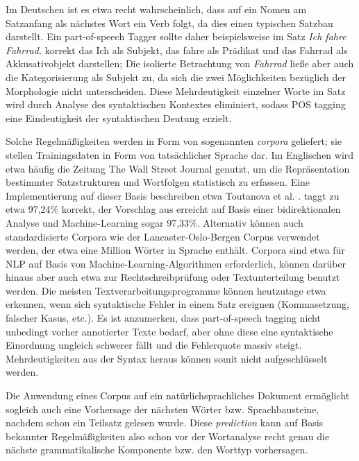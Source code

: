 \documentclass[12pt]{report}
\begin{document}
Im Deutschen ist es etwa recht wahrscheinlich, dass auf ein Nomen am Satzanfang als nächstes Wort ein Verb folgt, da dies einen typischen Satzbau darstellt. Ein part-of-speech Tagger sollte daher beispielsweise im Satz \textit{\glqq  Ich fahre Fahrrad.\grqq{}} korrekt das \glqq  Ich\grqq{} als Subjekt, das \glqq  fahre\grqq{} als Prädikat und das \glqq  Fahrrad\grqq{} als Akkusativobjekt darstellen; Die isolierte Betrachtung von \textit{\glqq  Fahrrad\grqq{}} ließe aber auch die Kategorisierung als Subjekt zu, da sich die zwei Möglichkeiten bezüglich der Morphologie nicht unterscheiden. Diese Mehrdeutigkeit einzelner Worte im Satz wird durch Analyse des syntaktischen Kontextes eliminiert, sodass POS tagging eine Eindeutigkeit der syntaktischen Deutung erzielt.

Solche Regelmäßigkeiten werden in Form von sogenannten \textit{corpora} geliefert; sie stellen Trainingsdaten in Form von tatsächlicher Sprache dar. Im Englischen wird etwa häufig die Zeitung The Wall Street Journal genutzt, um die Repräsentation bestimmter Satzstrukturen und Wortfolgen statistisch zu erfassen. Eine Implementierung auf dieser Basis beschreiben etwa Toutanova et al. \cite{tou03}. 
\cite{tou03} taggt zu etwa 97,24\% korrekt, der Vorschlag aus \cite{she07} erreicht auf Basis einer bidirektionalen Analyse und Machine-Learning sogar 97,33\%.
 Alternativ können auch standardisierte Corpora wie der Lancaster-Oslo-Bergen Corpus verwendet werden, der etwa eine Million Wörter in Sprache enthält. Corpora sind etwa für NLP auf Basis von Machine-Learning-Algorithmen erforderlich, können darüber hinaus aber auch etwa zur Rechtschreibprüfung oder Textunterteilung benutzt werden. Die meisten Textverarbeitungsprogramme können heutzutage etwa erkennen, wenn sich syntaktische Fehler in einem Satz ereignen (Kommasetzung, falscher Kasus, etc.). Es ist anzumerken, dass part-of-speech tagging nicht unbedingt vorher annotierter Texte bedarf, aber ohne diese eine syntaktische Einordnung ungleich schwerer fällt und die Fehlerquote massiv steigt. Mehrdeutigkeiten aus der Syntax heraus können somit nicht aufgeschlüsselt werden.

Die Anwendung eines Corpus auf ein natürlichsprachliches Dokument ermöglicht sogleich auch eine Vorhersage der nächsten Wörter bzw. Sprachbausteine, nachdem schon ein Teilsatz gelesen wurde. Diese \textit{prediction} kann auf Basis bekannter Regelmäßigkeiten also schon vor der Wortanalyse recht genau die nächste grammatikalische Komponente bzw. den Worttyp vorhersagen.
\end{document}
